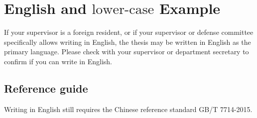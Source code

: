 
\chapter{English and $\text{lower-case}$ Example}

If your supervisor is a foreign resident, or if your supervisor or defense committee specifically allows writing in English, the thesis may be written in English as the primary language. Please check with your supervisor or department secretary to confirm if you can write in English.

\section{Reference guide}

Writing in English still requires the Chinese reference standard GB/T 7714-2015.


